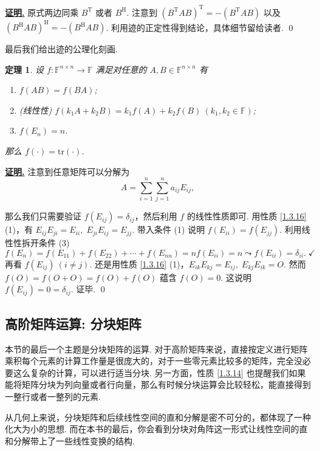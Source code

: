 \documentclass[10pt,openany]{article}
\theoremstyle{thmstyle} %
\newtheorem{theorem}{定理}[subsection]
\theoremstyle{defstyle} %
\theoremstyle{prostyle} %
\theoremstyle{exastyle}
\theoremstyle{remstyle}
\renewenvironment{proof}[1][证明]{\par\underline{\textbf{#1.}} \;\fangsong}{\qed\par}
\newcommand{\T}{^{\text{T}}}
\newcommand{\Her}{^{\text{H}}}
\newcommand{\F}{\mathbb{F}}
\newcommand{\n}{^{n \times n}}
\newcommand{\tr}{\mathrm{tr}}
\begin{document}
\begin{proof}
	原式两边同乘 \( B\T \) 或者 \( B\Her \). 注意到 \( (B\T AB)\T=-(B\T AB) \) 以及 \( (B\Her AB)\Her=-(B\Her AB) \). 利用迹的正定性得到结论，具体细节留给读者. 
\end{proof}



最后我们给出迹的公理化刻画. 

\begin{theorem}
	设 \( f: \F\n \to \F \) 满足对任意的 \( A,B \in \F\n \) 有
	\begin{enumerate}[(1)]
		\item \( f(AB)=f(BA) \);
		\item (线性性) \( f(k_1A+k_2B)=k_1f(A)+k_2f(B) \ (k_1,k_2 \in \F) \);
		\item \( f(E_n)=n \).
	\end{enumerate}
	
	那么 \( f(\cdot)=\tr(\cdot) \).
\end{theorem}

\begin{proof}
	注意到任意矩阵可以分解为
	\[ A=\sum_{i=1}^{n}\sum_{j=1}^{n} a_{ij}E_{ij}, \]
	
	那么我们只需要验证 \( f(E_{ij})=\delta_{ij} \)，然后利用 \( f \) 的线性性质即可. 用性质 \ref{1.3.16} (1)，有 \( E_{ij}E_{ji}=E_{ii}, \; E_{ji}E_{ij}=E_{jj} \). 带入条件 (1) 说明 \( f(E_{ii})=f(E_{jj}) \). 利用线性性拆开条件 (3) 
	\[ f(E_n)=f(E_{11})+f(E_{22})+\cdots+f(E_{nn})= nf(E_{ii})=n \leadsto f(E_{ii})=\delta_{ii}. \; \checkmark \]
	再看 \( f(E_{ij}) \ (i \neq j) \). 还是用性质 \ref{1.3.16} (1)，\( E_{ik}E_{kj}=E_{ij}, \; E_{kj}E_{ik}=O \). 然而 \( f(O)=f(O+O)=f(O)+f(O) \) 蕴含 \( f(O)=0 \). 这说明 \( f(E_{ij})=0=\delta_{ij} \). 证毕.
\end{proof}

\subsection{高阶矩阵运算: 分块矩阵}

本节的最后一个主题是分块矩阵的运算. 对于高阶矩阵来说，直接按定义进行矩阵乘积每个元素的计算工作量是很庞大的，对于一些零元素比较多的矩阵，完全没必要这么复杂的计算，可以进行适当分块. 另一方面，性质 \ref{1.3.14} 也提醒我们如果能将矩阵分块为列向量或者行向量，那么有时候分块运算会比较轻松，能直接得到一整行或者一整列的元素.

从几何上来说，分块矩阵和后续线性空间的直和分解是密不可分的，都体现了一种化大为小的思想. 而在本书的最后，你会看到分块对角阵这一形式让线性空间的直和分解带上了一些线性变换的结构. 
\end{document}
